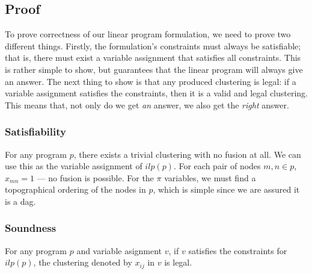 \subsection{Proof}
To prove correctness of our linear program formulation, we need to prove two different things.
Firstly, the formulation's constraints must always be satisfiable; that is, there must exist a variable assignment that satisfies all constraints.
This is rather simple to show, but guarantees that the linear program will always give an answer.
The next thing to show is that any produced clustering is legal: if a variable assignment satisfies the constraints, then it is a valid and legal clustering.
This means that, not only do we get \emph{an} answer, we also get the \emph{right} answer.

\subsubsection{Satisfiability}
For any program $p$, there exists a trivial clustering with no fusion at all.
We can use this as the variable assignment of $ilp(p)$.
For each pair of nodes $m,n \in p$, $x_{mn} = 1$ --- no fusion is possible.
For the $\pi$ variables, we must find a topographical ordering of the nodes in $p$, which is simple since we are assured it is a dag.



\subsubsection{Soundness}
For any program $p$ and variable asignment $v$, if $v$ satisfies the constraints for $ilp(p)$, the clustering denoted by $x_{ij}$ in $v$ is legal.

